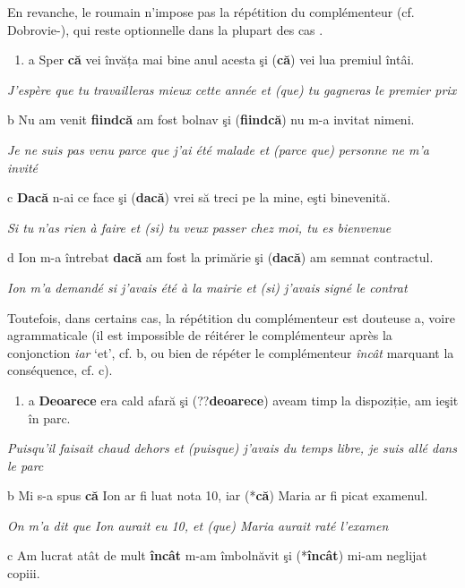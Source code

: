 En revanche, le roumain n'impose pas la répétition du complémenteur (cf. Dobrovie-\citet{Sorin1994}), qui reste optionnelle dans la plupart des cas . 


\begin{enumerate}
\item \label{bkm:Ref273480950}a  Sper \textbf{că} vei învăța mai bine anul acesta şi (\textbf{că}) vei lua premiul întâi.


\end{enumerate}
{\itshape
J'espère que tu travailleras mieux cette année et (que) tu gagneras le premier prix}

  b  Nu am venit \textbf{fiindcă} am fost bolnav şi (\textbf{fiindcă}) nu m-a invitat nimeni. 

{\itshape
Je ne suis pas venu parce que j'ai été malade et (parce que) personne ne m'a invité}

  c  \textbf{Dacă} n-ai ce face şi (\textbf{dacă}) vrei să treci pe la mine, eşti binevenită.

{\itshape
Si tu n'as rien à faire et (si) tu veux passer chez moi, tu es bienvenue}

  d  Ion m-a întrebat \textbf{dacă} am fost la primărie şi (\textbf{dacă}) am semnat contractul.

    \textit{Ion m'a demandé si j'avais été à la mairie et (si) j'avais signé le contrat}

Toutefois, dans certains cas, la répétition du complémenteur est douteuse a, voire agrammaticale (il est impossible de réitérer le complémenteur après la conjonction \textit{iar} `et', cf. b, ou bien de répéter le complémenteur \textit{încât} marquant la conséquence, cf. c).


\begin{enumerate}
\item \label{bkm:Ref273479978}a  \textbf{Deoarece} era cald afară şi (??\textbf{deoarece}) aveam timp la dispoziție, am ieşit în parc.


\end{enumerate}
{\itshape
Puisqu'il faisait chaud dehors et (puisque) j'avais du temps libre, je suis allé dans le parc}

  b  Mi s-a spus \textbf{că} Ion ar fi luat nota 10, iar (*\textbf{că}) Maria ar fi picat examenul.

{\itshape
On m'a dit que Ion aurait eu 10, et (que) Maria aurait raté l'examen}

  c  Am lucrat atât de mult \textbf{încât} m-am îmbolnăvit şi (*\textbf{încât})\textbf{} mi-am neglijat copiii. 

